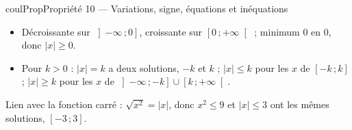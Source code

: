 \documentclass[11pt,a4paper]{article}
\makeatletter
\renewcommand{\le}{\leqslant}
\renewcommand{\ge}{\geqslant}
\newcommand{\lycee@intff}[2]{\left[#1\,;#2\right]}
\newcommand{\lycee@intfo}[2]{\left[#1\,;#2\right[}
\newcommand{\lycee@intof}[2]{\left]#1\,;#2\right]}
\providecommand{\intff}{\lycee@intff}%
\providecommand{\intfo}{\lycee@intfo}%
\providecommand{\intof}{\lycee@intof}%
\newcounter{lycee@signet}
\newcommand{\signet}[3][]{\stepcounter{lycee@signet}%
  \edef\lycee@dest{\if\relax\detokenize{#1}\relax
    signet.\arabic{lycee@signet}\else#1\fi}%
  \hypertarget{\lycee@dest}{}\bookmark[level=#2,dest=\lycee@dest]{#3}}
\newenvironment{proprietebox}[1][Propriété]%
  {\begin{boitecours}[phantom={\signet{2}{#1}}]{coulProp}{#1}}{\end{boitecours}}
\makeatother
\begin{document}
\begin{proprietebox}[Propriété 10 --- Variations, signe, équations et inéquations]
\begin{minipage}[c]{0.56\linewidth}\raggedright
\begin{itemize}
  \item Décroissante sur $\intof{-\infty}{0}$, croissante sur $\intfo{0}{+\infty}$ ;
        minimum $0$ en $0$, donc $|x|\ge 0$.
  \item Pour $k>0$ : $|x|=k$ a deux solutions, $-k$ et $k$ ; $|x|\le k$ pour les $x$ de
        $\intff{-k}{k}$ ; $|x|\ge k$ pour les $x$ de
        $\intof{-\infty}{-k}\cup\intfo{k}{+\infty}$.
\end{itemize}
\end{minipage}\hfill
\begin{minipage}[c]{0.40\linewidth}\centering
{}
\end{minipage}

\smallskip
Lien avec la fonction carré : $\sqrt{x^{2}}=|x|$, donc $x^{2}\le 9$ et $|x|\le 3$ ont les
mêmes solutions, $\intff{-3}{3}$.
\end{proprietebox}
\end{document}
